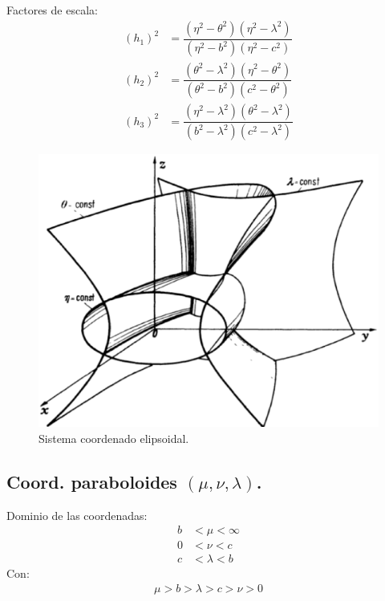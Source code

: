 \documentclass[12pt]{article}
\numberwithin{equation}{section}
\begin{document}
Factores de escala:
\begin{align*}
(h_{1})^{2} &= \dfrac{(\eta^{2} - \theta^{2})(\eta^{2} - \lambda^{2})}{(\eta^{2} - b^{2})(\eta^{2} - c^{2})} \\[0.5em]
(h_{2})^{2} &= \dfrac{(\theta^{2} - \lambda^{2})(\eta^{2} - \theta^{2})}{(\theta^{2} - b^{2})(c^{2} - \theta^{2})} \\[0.5em]
(h_{3})^{2} &= \dfrac{(\eta^{2} - \lambda^{2})(\theta^{2} - \lambda^{2})}{(b^{2} -  \lambda^{2})(c^{2} - \lambda^{2})}
\end{align*}

\begin{figure}[H]
    \centering
    \includegraphics[scale=0.5]{Imagenes/Sistema_Elipsoidal.eps}
    \caption{Sistema coordenado elipsoidal.}
\end{figure}

\subsection{Coord. paraboloides \texorpdfstring{$(\mu, \nu, \lambda)$}{(m, n, l)}.}

Dominio de las coordenadas:
\begin{align*}
b &< \mu < \infty \\
0 &< \nu < c \\
c &< \lambda < b
\end{align*}
Con:
\begin{align*}
\mu > b > \lambda > c > \nu > 0
\end{align*}
\end{document}
